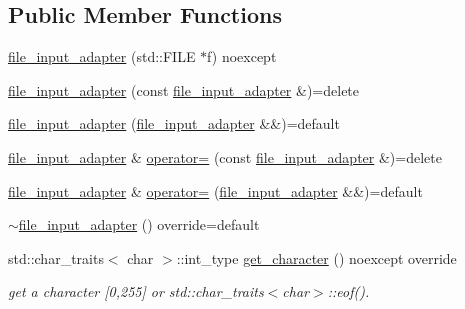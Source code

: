 \subsection*{Public Member Functions}
\begin{DoxyCompactItemize}
\item 
\mbox{\hyperlink{classnlohmann_1_1detail_1_1file__input__adapter_aeade050f2793280503be93feff2ece5b}{file\+\_\+input\+\_\+adapter}} (std\+::\+F\+I\+LE $\ast$f) noexcept
\item 
\mbox{\hyperlink{classnlohmann_1_1detail_1_1file__input__adapter_a308099b496a0cba2123a06fe99a95d02}{file\+\_\+input\+\_\+adapter}} (const \mbox{\hyperlink{classnlohmann_1_1detail_1_1file__input__adapter}{file\+\_\+input\+\_\+adapter}} \&)=delete
\item 
\mbox{\hyperlink{classnlohmann_1_1detail_1_1file__input__adapter_a10b4dec4e8751a4f8a110fa917f0d5a8}{file\+\_\+input\+\_\+adapter}} (\mbox{\hyperlink{classnlohmann_1_1detail_1_1file__input__adapter}{file\+\_\+input\+\_\+adapter}} \&\&)=default
\item 
\mbox{\hyperlink{classnlohmann_1_1detail_1_1file__input__adapter}{file\+\_\+input\+\_\+adapter}} \& \mbox{\hyperlink{classnlohmann_1_1detail_1_1file__input__adapter_ad59bbc7e3f23dd74475c5cb818784e42}{operator=}} (const \mbox{\hyperlink{classnlohmann_1_1detail_1_1file__input__adapter}{file\+\_\+input\+\_\+adapter}} \&)=delete
\item 
\mbox{\hyperlink{classnlohmann_1_1detail_1_1file__input__adapter}{file\+\_\+input\+\_\+adapter}} \& \mbox{\hyperlink{classnlohmann_1_1detail_1_1file__input__adapter_a95adaec9a8c583a46083c4c493981e77}{operator=}} (\mbox{\hyperlink{classnlohmann_1_1detail_1_1file__input__adapter}{file\+\_\+input\+\_\+adapter}} \&\&)=default
\item 
\mbox{\hyperlink{classnlohmann_1_1detail_1_1file__input__adapter_af96552e4560be08b201e62a36e6b6189}{$\sim$file\+\_\+input\+\_\+adapter}} () override=default
\item 
std\+::char\+\_\+traits$<$ char $>$\+::int\+\_\+type \mbox{\hyperlink{classnlohmann_1_1detail_1_1file__input__adapter_a0d4ff48617c8f63c30babdfd09482329}{get\+\_\+character}} () noexcept override
\begin{DoxyCompactList}\small\item\em get a character \mbox{[}0,255\mbox{]} or std\+::char\+\_\+traits$<$char$>$\+::eof(). \end{DoxyCompactList}\end{DoxyCompactItemize}



